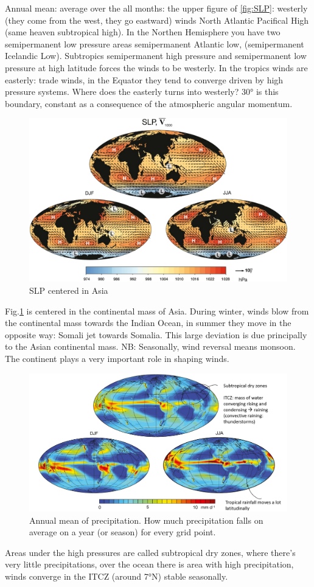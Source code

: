 Annual mean: average over the all months: the upper figure of \ref{fig:SLP}: westerly (they come from the west, they go eastward) winds North Atlantic Pacifical High (same heaven subtropical high). In the Northen Hemisphere you have two semipermanent low pressure  areas semipermanent Atlantic low, (semipermanent Icelandic Low). Subtropics semipermanent high pressure and semipermanent low pressure at high latitude forces the winds to be westerly. In the tropics winds are easterly: trade winds, in the Equator they tend to converge driven by high pressure systems. Where does the easterly turns into westerly? 30° is this boundary,  constant as a consequence of the atmospheric angular momentum. 
\begin{figure}[htpb]
    \centering
    \includegraphics[width=0.5\linewidth]{uploads/SLP centered in Asia.png}
    \caption{SLP centered in Asia}
    \label{fig:SLP Asia}
\end{figure}
Fig.\ref{fig:SLP Asia} is centered in the continental mass of Asia. During winter, winds blow from the continental mass towards the Indian Ocean, in summer they move in the opposite way: Somali jet towards Somalia. This large deviation is due principally to the Asian continental mass. NB: Seasonally, wind reversal means monsoon. The continent plays a very important role in shaping winds. 
\begin{figure}[htpb]
    \centering
    \includegraphics[width=0.5\linewidth]{uploads/Precipitation.png}
    \caption{Annual mean of precipitation. How much precipitation falls on average on a year (or season) for every grid point.}
    \label{fig:precipit}
\end{figure}
Areas under the high pressures are called subtropical dry zones, where there's very little precipitations, over the ocean there is area with high precipitation, winds converge in the ITCZ (around 7°N) stable seasonally.
